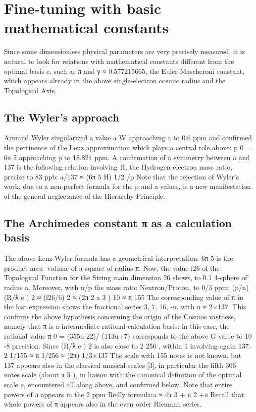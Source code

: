 \chapter{Fine-tuning with basic mathematical constants}

Since some dimensionless physical parameters are very precisely measured, it is natural to look for
relations with mathematical constants different from the optimal basis e, such as π and γ ≈
0.577215665, the Euler-Mascheroni constant, which appears already in the above single-electron
cosmic radius and the Topological Axis.

\section {The Wyler's approach}

Armand Wyler singularized a value a W approaching a to 0.6 ppm and confirmed the pertinence
of the Lenz approximation which plays a central role above: p 0 = 6π 5 approaching p to 18.824 ppm.
A confirmation of a symmetry between a and 137 is the following relation involving H, the
Hydrogen electron mass ratio, precise to 83 ppb:
a/137 ≈ (6π 5 H) 1/2 /p
Note that the rejection of Wyler's work, due to a non-perfect formula for the p and a values, is a new
manifestation of the general neglectance of the Hierarchy Principle.

\section {The Archimedes constant π as a calculation basis}

The above Lenz-Wyler formula has a geometrical interpretation: 6π 5 is the product area-
volume of a square of radius π. Now, the value f{26} of the Topological Function for the String
main dimension 26 shows, to 0.1 %
4-sphere of radius a. Moreover, with n/p the mass ratio Neutron/Proton, to 0/3%
ppm:
(p/n) (R/ƛ e ) 2 ≈ (f{26}/6) 2 ≈ (2π 2 a 3 ) 10 ≈ π 155
The corresponding value of π in the last expression shows the fractional series 3, 7, 16, -u, with u ≈
2×137. This confirms the above hypothesis concerning the origin of the Cosmos vastness, namely
that π is a intermediate rational calculation basis: in this case, the rational value π 0 = (355u-22)/
(113u+7) corresponds to the above G value to 10 -8 precision.
Since (R/ƛ e ) 2 is also close to 2 256 , within 1%
involving again 137:
2 1/155 ≈ π 1/256 ≈ (2π) 1/3×137
The scale with 155 notes is not known, but 137 appears also in the classical musical scales [3], in
particular the fifth 306 notes scale (about π 5 ), in liaison with the canonical definition of the optimal
scale e, encountered all along above, and confirmed below.
Note that entire powers of π appears in the 2 ppm Reilly formula:a ≈ 4π 3 + π 2 +π
Recall that whole powers of π appears also in the even order Riemann series.

